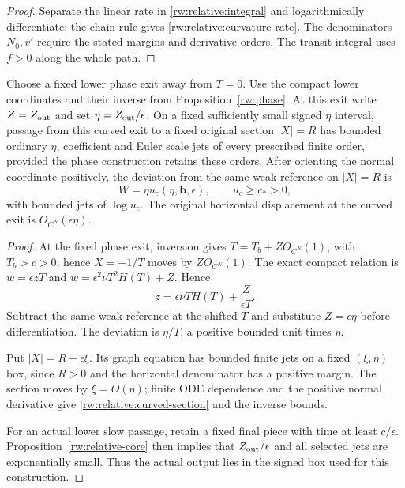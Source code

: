 \begin{proof}
Separate the linear rate in \eqref{rw:relative:integral} and logarithmically
differentiate; the chain rule gives \eqref{rw:relative:curvature-rate}.
The denominators $N_0,v'$ require the stated margins and derivative
orders. The transit integral uses $f>0$ along the whole path.
\end{proof}

\begin{lemma}
\label{rw:transitions:curved-exit}
Choose a fixed lower phase exit away from $T=0$. Use the compact lower
coordinates and their inverse from Proposition~\ref{rw:phase}. At this
exit write $Z=Z_{\rm out}$ and set $\eta=Z_{\rm out}/\epsilon$.
On a fixed sufficiently small signed $\eta$ interval, passage from this
curved exit to a fixed original section $|X|=R$ has bounded ordinary
$\eta$, coefficient and Euler scale jets of every prescribed finite
order, provided the phase construction retains these orders. After
orienting the normal coordinate positively, the deviation from the
same weak reference on $|X|=R$ is
\begin{equation}\label{rw:relative:curved-section}
 W=\eta u_c(\eta,\mathbf b,\epsilon),\qquad
 u_c\ge c_*>0,
\end{equation}
with bounded jets of $\log u_c$. The original horizontal displacement
at the curved exit is $O_{C^N}(\epsilon\eta)$.
\end{lemma}

\begin{proof}
At the fixed phase exit, inversion gives $T=T_b+ZO_{C^N}(1)$,
with $T_b>c>0$; hence $X=-1/T$ moves by $ZO_{C^N}(1)$.
The exact compact relation is $w=\epsilon zT$ and
$w=\epsilon^2\nu T^2H(T)+Z$. Hence
\[
 z=\epsilon\nu TH(T)+\frac{Z}{\epsilon T}.
\]
Subtract the same weak reference at the shifted $T$ and substitute
$Z=\epsilon\eta$ before differentiation. The deviation is $\eta/T$,
a positive bounded unit times $\eta$.

Put $|X|=R+\epsilon\xi$. Its graph equation has bounded finite jets
on a fixed $(\xi,\eta)$ box, since $R>0$ and the horizontal denominator
has a positive margin. The section moves by $\xi=O(\eta)$; finite
ODE dependence and the positive normal derivative give
\eqref{rw:relative:curved-section} and the inverse bounds.

For an actual lower slow passage, retain a fixed final piece with
time at least $c/\epsilon$. Proposition~\ref{rw:relative-core} then
implies that $Z_{\rm out}/\epsilon$ and all selected jets are
exponentially small. Thus the actual output lies in the signed box
used for this construction.
\end{proof}

